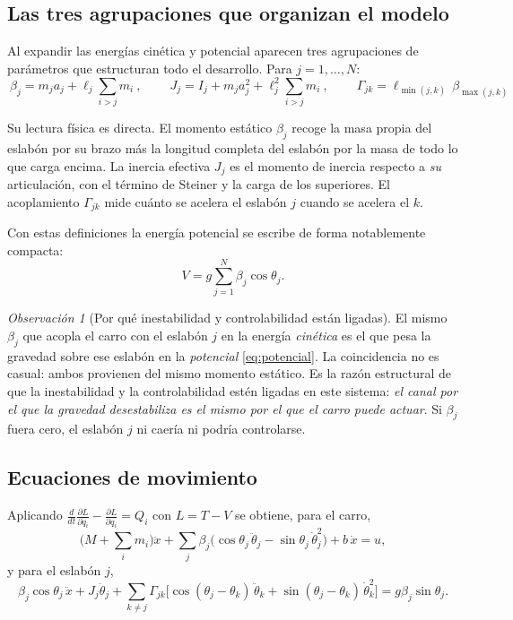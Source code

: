 \documentclass[11pt,letterpaper]{article}
\theoremstyle{definition}
\theoremstyle{plain}
\theoremstyle{remark}
\newtheorem{observacion}[definicion]{Observación}
\begin{document}
\subsection{Las tres agrupaciones que organizan el modelo}

Al expandir las energías cinética y potencial aparecen tres agrupaciones de
parámetros que estructuran todo el desarrollo. Para $j=1,\dots,N$:
\begin{equation}
\boxed{\ \beta_j=m_ja_j+\ell_j\!\!\sum_{i>j}m_i\ },\qquad
\boxed{\ J_j=I_j+m_ja_j^2+\ell_j^2\!\!\sum_{i>j}m_i\ },\qquad
\boxed{\ \Gamma_{jk}=\ell_{\min(j,k)}\,\beta_{\max(j,k)}\ }
\label{eq:agrupaciones}
\end{equation}

Su lectura física es directa. El momento estático $\beta_j$ recoge la masa
propia del eslabón por su brazo más la longitud completa del eslabón por la masa
de todo lo que carga encima. La inercia efectiva $J_j$ es el momento de inercia
respecto a \emph{su} articulación, con el término de Steiner y la carga de los
superiores. El acoplamiento $\Gamma_{jk}$ mide cuánto se acelera el eslabón $j$
cuando se acelera el $k$.

Con estas definiciones la energía potencial se escribe de forma notablemente
compacta:
\begin{equation}
V=g\sum_{j=1}^{N}\beta_j\cos\theta_j.
\label{eq:potencial}
\end{equation}

\begin{observacion}[Por qué inestabilidad y controlabilidad están ligadas]
\label{obs:beta}
El mismo $\beta_j$ que acopla el carro con el eslabón $j$ en la energía
\emph{cinética} es el que pesa la gravedad sobre ese eslabón en la
\emph{potencial} \cref{eq:potencial}. La coincidencia no es casual: ambos
provienen del mismo momento estático. Es la razón estructural de que la
inestabilidad y la controlabilidad estén ligadas en este sistema: \emph{el canal
por el que la gravedad desestabiliza es el mismo por el que el carro puede
actuar}. Si $\beta_j$ fuera cero, el eslabón $j$ ni caería ni podría
controlarse.
\end{observacion}

\subsection{Ecuaciones de movimiento}

Aplicando $\frac{d}{dt}\frac{\partial L}{\partial\dot q_i}-\frac{\partial L}{\partial q_i}=Q_i$
con $L=T-V$ se obtiene, para el carro,
\begin{equation}
\Big(M+\sum_i m_i\Big)\ddot x+\sum_{j}\beta_j\big(\cos\theta_j\,\ddot\theta_j-\sin\theta_j\,\dot\theta_j^2\big)+b\,\dot x=u,
\label{eq:eomcarro}
\end{equation}
y para el eslabón $j$,
\begin{equation}
\beta_j\cos\theta_j\,\ddot x+J_j\ddot\theta_j+\sum_{k\neq j}\Gamma_{jk}\big[\cos(\theta_j-\theta_k)\,\ddot\theta_k+\sin(\theta_j-\theta_k)\,\dot\theta_k^2\big]=g\beta_j\sin\theta_j.
\label{eq:eomeslabon}
\end{equation}
\end{document}
